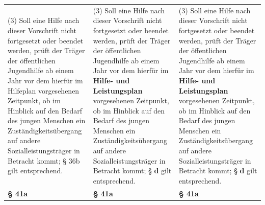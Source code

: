 \documentclass[10pt,a4paper,landscape]{article}
\begin{document}
\begin{longtable}{|L{8.2cm}|L{8.2cm}|L{8.2cm}|}
(3) Soll eine Hilfe nach dieser Vorschrift  \newline nicht fortgesetzt oder beendet werden,  \newline prüft der Träger der öffentlichen  \newline Jugendhilfe ab einem Jahr vor dem hierfür  \newline im \textcolor{diffred}{Hilfeplan} vorgesehenen Zeitpunkt, ob im  \newline Hinblick auf den Bedarf des jungen  \newline Menschen ein Zuständigkeitsübergang auf  \newline andere Sozialleistungsträger in Betracht  \newline kommt; \S{} \textcolor{diffred}{36b} gilt entsprechend. & (3) Soll eine Hilfe nach dieser Vorschrift  \newline nicht fortgesetzt oder beendet werden,  \newline prüft der Träger der öffentlichen  \newline Jugendhilfe ab einem Jahr vor dem hierfür  \newline im \textbf{Hilfe- und Leistungsplan}  \newline vorgesehenen Zeitpunkt, ob im Hinblick auf  \newline den Bedarf des jungen Menschen ein  \newline Zuständigkeitsübergang auf andere  \newline Sozialleistungsträger in Betracht kommt; \S{}  \textbf{d} gilt entsprechend. & (3) Soll eine Hilfe nach dieser Vorschrift  \newline nicht fortgesetzt oder beendet werden,  \newline prüft der Träger der öffentlichen  \newline Jugendhilfe ab einem Jahr vor dem hierfür  \newline im \textbf{Hilfe- und Leistungsplan}  \newline vorgesehenen Zeitpunkt, ob im Hinblick auf  \newline den Bedarf des jungen Menschen ein  \newline Zuständigkeitsübergang auf andere  \newline Sozialleistungsträger in Betracht kommt; \S{}  \textbf{d} gilt entsprechend. \\
\hhline{|---|}
\textbf{\S{} 41a} & \textbf{\S{} 41a} & \textbf{\S{} 41a} \\

\end{longtable}
\end{document}
